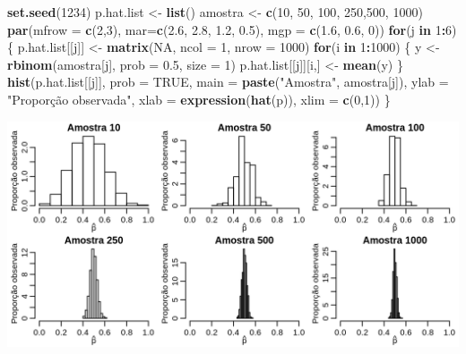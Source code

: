 \documentclass[10pt,a4paper]{book}
\newenvironment{Shaded}{\begin{snugshade}}{\end{snugshade}}
\newcommand{\KeywordTok}[1]{\textcolor[rgb]{0.13,0.29,0.53}{\textbf{#1}}}
\newcommand{\DataTypeTok}[1]{\textcolor[rgb]{0.13,0.29,0.53}{#1}}
\newcommand{\DecValTok}[1]{\textcolor[rgb]{0.00,0.00,0.81}{#1}}
\newcommand{\FloatTok}[1]{\textcolor[rgb]{0.00,0.00,0.81}{#1}}
\newcommand{\StringTok}[1]{\textcolor[rgb]{0.31,0.60,0.02}{#1}}
\newcommand{\OtherTok}[1]{\textcolor[rgb]{0.56,0.35,0.01}{#1}}
\newcommand{\ControlFlowTok}[1]{\textcolor[rgb]{0.13,0.29,0.53}{\textbf{#1}}}
\newcommand{\OperatorTok}[1]{\textcolor[rgb]{0.81,0.36,0.00}{\textbf{#1}}}
\newcommand{\NormalTok}[1]{#1}
\begin{document}
\begin{Shaded}
\begin{Highlighting}[]
\KeywordTok{set.seed}\NormalTok{(}\DecValTok{1234}\NormalTok{)}
\NormalTok{p.hat.list <-}\StringTok{ }\KeywordTok{list}\NormalTok{()}
\NormalTok{amostra <-}\StringTok{ }\KeywordTok{c}\NormalTok{(}\DecValTok{10}\NormalTok{, }\DecValTok{50}\NormalTok{, }\DecValTok{100}\NormalTok{, }\DecValTok{250}\NormalTok{,}\DecValTok{500}\NormalTok{, }\DecValTok{1000}\NormalTok{)}
\KeywordTok{par}\NormalTok{(}\DataTypeTok{mfrow =} \KeywordTok{c}\NormalTok{(}\DecValTok{2}\NormalTok{,}\DecValTok{3}\NormalTok{), }\DataTypeTok{mar=}\KeywordTok{c}\NormalTok{(}\FloatTok{2.6}\NormalTok{, }\FloatTok{2.8}\NormalTok{, }\FloatTok{1.2}\NormalTok{, }\FloatTok{0.5}\NormalTok{), }\DataTypeTok{mgp =} \KeywordTok{c}\NormalTok{(}\FloatTok{1.6}\NormalTok{, }\FloatTok{0.6}\NormalTok{, }\DecValTok{0}\NormalTok{))}
\ControlFlowTok{for}\NormalTok{(j }\ControlFlowTok{in} \DecValTok{1}\OperatorTok{:}\DecValTok{6}\NormalTok{) \{}
\NormalTok{  p.hat.list[[j]] <-}\StringTok{ }\KeywordTok{matrix}\NormalTok{(}\OtherTok{NA}\NormalTok{, }\DataTypeTok{ncol =} \DecValTok{1}\NormalTok{, }\DataTypeTok{nrow =} \DecValTok{1000}\NormalTok{)}
  \ControlFlowTok{for}\NormalTok{(i }\ControlFlowTok{in} \DecValTok{1}\OperatorTok{:}\DecValTok{1000}\NormalTok{) \{}
\NormalTok{  y <-}\StringTok{ }\KeywordTok{rbinom}\NormalTok{(amostra[j], }\DataTypeTok{prob =} \FloatTok{0.5}\NormalTok{, }\DataTypeTok{size =} \DecValTok{1}\NormalTok{)}
\NormalTok{  p.hat.list[[j]][i,] <-}\StringTok{ }\KeywordTok{mean}\NormalTok{(y)}
\NormalTok{  \}}
\KeywordTok{hist}\NormalTok{(p.hat.list[[j]], }\DataTypeTok{prob =} \OtherTok{TRUE}\NormalTok{, }\DataTypeTok{main =} \KeywordTok{paste}\NormalTok{(}\StringTok{"Amostra"}\NormalTok{, amostra[j]), }
     \DataTypeTok{ylab =} \StringTok{"Proporção observada"}\NormalTok{,}
     \DataTypeTok{xlab =} \KeywordTok{expression}\NormalTok{(}\KeywordTok{hat}\NormalTok{(p)), }\DataTypeTok{xlim =} \KeywordTok{c}\NormalTok{(}\DecValTok{0}\NormalTok{,}\DecValTok{1}\NormalTok{))}
\NormalTok{\}}
\end{Highlighting}
\end{Shaded}

\begin{center}\includegraphics[width=0.99\linewidth]{figures/unnamed-chunk-381-1} \end{center}
\end{document}
